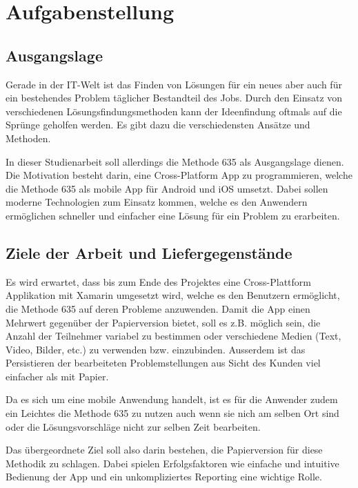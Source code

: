 \section{Aufgabenstellung}

\subsection{Ausgangslage}
Gerade in der IT-Welt ist das Finden von Lösungen für ein neues aber auch für ein bestehendes Problem täglicher Bestandteil des Jobs. Durch den Einsatz von verschiedenen Lösungs\-findungs\-methoden kann der Ideenfindung oftmals auf die Sprünge geholfen werden. Es gibt dazu die verschiedensten Ansätze und Methoden. 

In dieser Studienarbeit soll allerdings die Methode 635 \cite{methode-635} als Ausgangslage dienen. Die Motivation besteht darin, eine Cross-Platform App zu programmieren, welche die Methode 635 als mobile App für Android und iOS umsetzt. Dabei sollen moderne Technologien zum Einsatz kommen, welche es den Anwendern ermöglichen schneller und einfacher eine Lösung für ein Problem zu erarbeiten. 

\subsection{Ziele der Arbeit und Liefergegenstände}

Es wird erwartet, dass bis zum Ende des Projektes eine Cross-Plattform Applikation mit Xamarin umgesetzt wird, welche es den Benutzern ermöglicht, die Methode 635 auf deren Probleme anzuwenden. Damit die App einen Mehrwert gegenüber der Papierversion bietet, soll es z.B. möglich sein, die Anzahl der Teilnehmer variabel zu bestimmen oder verschiedene Medien (Text, Video, Bilder, etc.) zu verwenden bzw. einzubinden. Ausserdem ist das Persistieren der bearbeiteten Problemstellungen aus Sicht des Kunden viel einfacher als mit Papier.

Da es sich um eine mobile Anwendung handelt, ist es für die Anwender zudem ein Leichtes die Methode 635 zu nutzen auch wenn sie nich am selben Ort sind oder die Lösungsvorschläge nicht zur selben Zeit bearbeiten. 

Das übergeordnete Ziel soll also darin bestehen, die Papierversion für diese Methodik zu schlagen. Dabei spielen Erfolgsfaktoren wie einfache und intuitive Bedienung der App und ein unkompliziertes Reporting eine wichtige Rolle.

